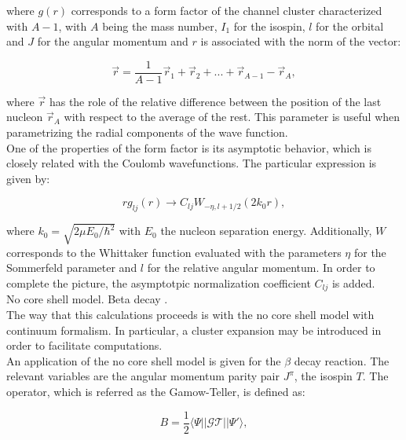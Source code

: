 \documentclass[openany]{book}
\begin{document}
where $g(r)$ corresponds to a form factor of the channel cluster characterized with $A - 1$, with $A$ being the mass number, $I_1$ for the isospin, $l$ for the orbital and $J$ for the angular momentum and $r$ is associated with the norm of the vector: 

\begin{equation}\label{eq:micro_NCSH_application_r}
	\vec r  = \frac{1} {A - 1} \vec r_1 + \vec r_2 + ... + \vec r_{A-1} - \vec r_A,
\end{equation}

where $\vec r$ has the role of the relative difference between the position of the last nucleon $\vec r_A$ with respect to the average of the rest. This parameter is useful when parametrizing the radial components of the wave function. \\

One of the properties of the form factor is its asymptotic behavior, which is closely related with the Coulomb wavefunctions. The particular expression is given by: 

\begin{equation}\label{eq:micro_NCSH_application_asymptotics}
	r g_{lj}(r) \rightarrow C_{lj} W_{-\eta , l + 1/2} (2k_0r), 
\end{equation}

where $k_0 = \sqrt{2\mu E_0/\hbar^2}$ with $E_0$ the nucleon separation energy. Additionally, $W$ corresponds to the Whittaker function evaluated with the parameters $\eta$ for the Sommerfeld parameter and $l$ for the relative angular momentum. In order to complete the picture, the asymptotpic normalization coefficient $C_{lj}$ is added.  \\

No core shell model. Beta decay \cite{atkinson_navratil_hupin_kravvaris_quaglioni_2022}. \\

The way that this calculations proceeds is with the no core shell model with continuum formalism. In particular, a cluster expansion may be introduced in order to facilitate computations. \\

An application of the no core shell model is given for the $\beta$ decay reaction. The relevant variables are the angular momentum parity pair $J^\pi$, the isospin $T$. The operator, which is referred as the Gamow-Teller, is defined as: 

\begin{equation}\label{eq:micro_NCSM_beta_asymptotics}
	B = \frac{1}{2} \langle \Psi || \mathcal{GT} || \Psi ' \rangle, 
\end{equation}
\end{document}
